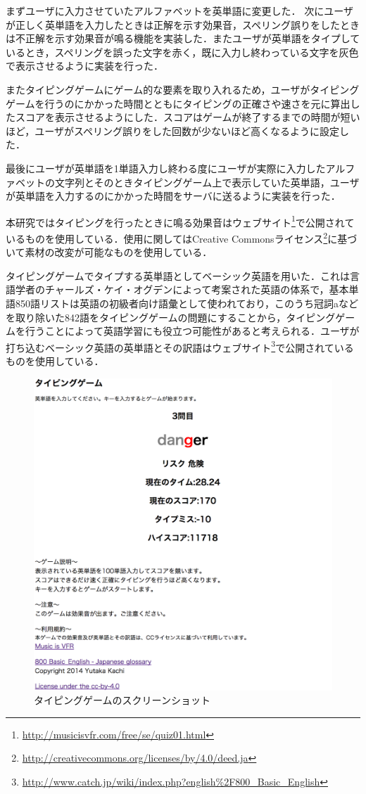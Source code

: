 まずユーザに入力させていたアルファベットを英単語に変更した．
次にユーザが正しく英単語を入力したときは正解を示す効果音，スペリング誤りをしたときは不正解を示す効果音が鳴る機能を実装した．またユーザが英単語をタイプしているとき，スペリングを誤った文字を赤く，既に入力し終わっている文字を灰色で表示させるように実装を行った．

またタイピングゲームにゲーム的な要素を取り入れるため，ユーザがタイピングゲームを行うのにかかった時間とともにタイピングの正確さや速さを元に算出したスコアを表示させるようにした．スコアはゲームが終了するまでの時間が短いほど，ユーザがスペリング誤りをした回数が少ないほど高くなるように設定した．

最後にユーザが英単語を1単語入力し終わる度にユーザが実際に入力したアルファベットの文字列とそのときタイピングゲーム上で表示していた英単語，ユーザが英単語を入力するのにかかった時間をサーバに送るように実装を行った．

本研究ではタイピングを行ったときに鳴る効果音はウェブサイト\footnote{\url{http://musicisvfr.com/free/se/quiz01.html}}で公開されているものを使用している．使用に関してはCreative Commonsライセンス\footnote{\url{http://creativecommons.org/licenses/by/4.0/deed.ja}}に基づいて素材の改変が可能なものを使用している．

タイピングゲームでタイプする英単語としてベーシック英語\cite{simpleenglish}を用いた．これは言語学者のチャールズ・ケイ・オグデンによって考案された英語の体系で，基本単語850語リストは英語の初級者向け語彙として使われており，このうち冠詞aなどを取り除いた842語をタイピングゲームの問題にすることから，タイピングゲームを行うことによって英語学習にも役立つ可能性があると考えられる．ユーザが打ち込むベーシック英語の英単語とその訳語はウェブサイト\footnote{\url{http://www.catch.jp/wiki/index.php?english\%2F800_Basic_English}}で公開されているものを使用している．

\begin{figure}[t]
	\begin{center}
		\includegraphics[width=15cm]{typing_game2.png}
		\caption{タイピングゲームのスクリーンショット}
		\label{LabelExa}
	\end{center}
\end{figure}
